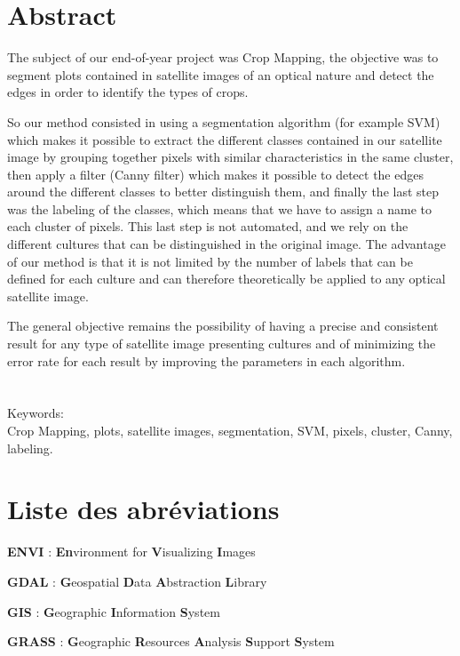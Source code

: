 \documentclass[12pt, openany]{report}
\begin{document}
\chapter*{Abstract}

The subject of our end-of-year project was Crop Mapping, the objective was to segment plots contained in satellite images of an optical nature and detect the edges in order to identify the types of crops.
\par
So our method consisted in using a segmentation algorithm (for example SVM) which makes it possible to extract the different classes contained in our satellite image by grouping together pixels with similar characteristics in the same cluster, then apply a filter (Canny filter) which makes it possible to detect the edges around the different classes to better distinguish them, and finally the last step was the labeling of the classes, which means that we have to assign a name to each cluster of pixels. This last step is not automated, and we rely on the different cultures that can be distinguished in the original image. The advantage of our method is that it is not limited by the number of labels that can be defined for each culture and can therefore theoretically be applied to any optical satellite image.
\par
The general objective remains the possibility of having a precise and consistent result for any type of satellite image presenting cultures and of minimizing the error rate for each result by improving the parameters in each algorithm.
\\
\\
\\
Keywords:\\
Crop Mapping, plots, satellite images, segmentation, SVM, pixels, cluster, Canny, labeling.


\chapter*{Liste des abréviations}
 
\textbf{ENVI} : \textbf{En}vironment for \textbf{V}isualizing \textbf{I}mages
 
\textbf{GDAL} : \textbf{G}eospatial \textbf{D}ata \textbf{A}bstraction \textbf{L}ibrary
 
\textbf{GIS} : \textbf{G}eographic \textbf{I}nformation \textbf{S}ystem
 
\textbf{GRASS} : \textbf{G}eographic \textbf{R}esources \textbf{A}nalysis \textbf{S}upport \textbf{S}ystem
 
\end{document}
